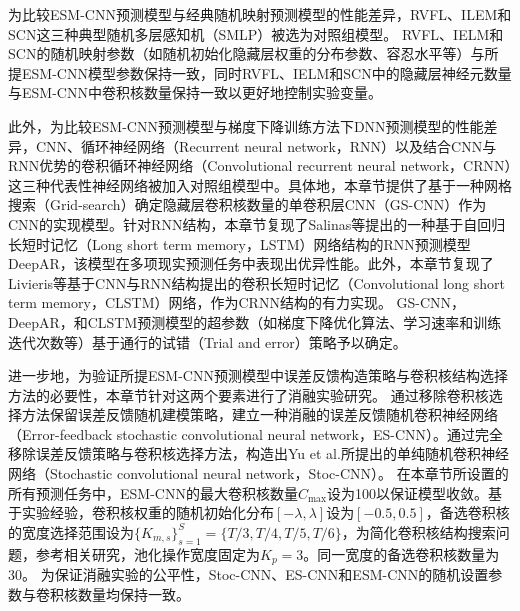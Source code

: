 为比较ESM-CNN预测模型与经典随机映射预测模型的性能差异，RVFL\cite{igelnik1995stochastic}、ILEM\cite{huang2006universal}和SCN\cite{wang2017stochastic}这三种典型随机多层感知机（SMLP）被选为对照组模型。
RVFL、IELM和SCN的随机映射参数（如随机初始化隐藏层权重的分布参数、容忍水平等）与所提ESM-CNN模型参数保持一致，同时RVFL、IELM和SCN中的隐藏层神经元数量与ESM-CNN中卷积核数量保持一致以更好地控制实验变量。

此外，为比较ESM-CNN预测模型与梯度下降训练方法下DNN预测模型的性能差异，CNN、循环神经网络（Recurrent neural network，RNN）以及结合CNN与RNN优势的卷积循环神经网络（Convolutional recurrent neural network，CRNN）这三种代表性神经网络被加入对照组模型中。具体地，本章节提供了基于一种网格搜索（Grid-search）确定隐藏层卷积核数量的单卷积层CNN（GS-CNN）作为CNN的实现模型。针对RNN结构，本章节复现了Salinas等\cite{salinasDeepAR2020}提出的一种基于自回归长短时记忆（Long short term memory，LSTM）网络结构的RNN预测模型DeepAR，该模型在多项现实预测任务中表现出优异性能。此外，本章节复现了Livieris等\cite{livieris2020cnn}基于CNN与RNN结构提出的卷积长短时记忆（Convolutional long short term memory，CLSTM）网络，作为CRNN结构的有力实现。
GS-CNN，DeepAR，和CLSTM预测模型的超参数（如梯度下降优化算法、学习速率和训练迭代次数等）基于通行的试错（Trial and error）策略予以确定。

进一步地，为验证所提ESM-CNN预测模型中误差反馈构造策略与卷积核结构选择方法的必要性，本章节针对这两个要素进行了消融实验研究。
通过移除卷积核选择方法保留误差反馈随机建模策略，建立一种消融的误差反馈随机卷积神经网络（Error-feedback stochastic convolutional neural network，ES-CNN）。通过完全移除误差反馈策略与卷积核选择方法，构造出Yu et al.\cite{yuImpact2019}所提出的单纯随机卷积神经网络（Stochastic convolutional neural network，Stoc-CNN）。
在本章节所设置的所有预测任务中，ESM-CNN的最大卷积核数量$C_{\max}$设为100以保证模型收敛。基于实验经验，卷积核权重的随机初始化分布$[-\lambda,\lambda]$设为$[-0.5,0.5]$，备选卷积核的宽度选择范围设为$ \{K_{m,s}\} ^S_{s=1} = \{T/3, T/4, T/5, T/6\}$，为简化卷积核结构搜索问题，参考相关研究\cite{zhao2017convolutional}，池化操作宽度固定为$K_p=3$。同一宽度的备选卷积核数量为30。
为保证消融实验的公平性，Stoc-CNN、ES-CNN和ESM-CNN的随机设置参数与卷积核数量均保持一致。

